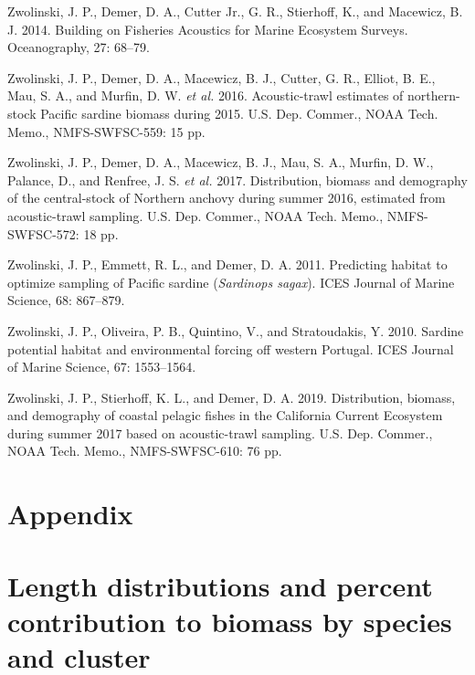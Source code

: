 \documentclass[]{article}
\begin{document}
\leavevmode\hypertarget{ref-Zwolinski2014}{}%
Zwolinski, J. P., Demer, D. A., Cutter Jr., G. R., Stierhoff, K., and Macewicz, B. J. 2014. Building on Fisheries Acoustics for Marine Ecosystem Surveys. Oceanography, 27: 68--79.

\leavevmode\hypertarget{ref-Zwolinski2016}{}%
Zwolinski, J. P., Demer, D. A., Macewicz, B. J., Cutter, G. R., Elliot, B. E., Mau, S. A., and Murfin, D. W. \emph{et al.} 2016. Acoustic-trawl estimates of northern-stock Pacific sardine biomass during 2015. U.S. Dep. Commer., NOAA Tech. Memo., NMFS-SWFSC-559: 15 pp.

\leavevmode\hypertarget{ref-Zwolinski2017}{}%
Zwolinski, J. P., Demer, D. A., Macewicz, B. J., Mau, S. A., Murfin, D. W., Palance, D., and Renfree, J. S. \emph{et al.} 2017. Distribution, biomass and demography of the central-stock of Northern anchovy during summer 2016, estimated from acoustic-trawl sampling. U.S. Dep. Commer., NOAA Tech. Memo., NMFS-SWFSC-572: 18 pp.

\leavevmode\hypertarget{ref-Zwolinski2011}{}%
Zwolinski, J. P., Emmett, R. L., and Demer, D. A. 2011. Predicting habitat to optimize sampling of Pacific sardine (\emph{Sardinops sagax}). ICES Journal of Marine Science, 68: 867--879.

\leavevmode\hypertarget{ref-Zwolinski2010}{}%
Zwolinski, J. P., Oliveira, P. B., Quintino, V., and Stratoudakis, Y. 2010. Sardine potential habitat and environmental forcing off western Portugal. ICES Journal of Marine Science, 67: 1553--1564.

\leavevmode\hypertarget{ref-Zwolinski2019a}{}%
Zwolinski, J. P., Stierhoff, K. L., and Demer, D. A. 2019. Distribution, biomass, and demography of coastal pelagic fishes in the California Current Ecosystem during summer 2017 based on acoustic-trawl sampling. U.S. Dep. Commer., NOAA Tech. Memo., NMFS-SWFSC-610: 76 pp.

\newpage

\hypertarget{appendix-appendix}{%
\appendix}


\hypertarget{appendix}{%
\section*{Appendix}\label{appendix}}

\hypertarget{appendix-cluster-length-percent}{%
\section{Length distributions and percent contribution to biomass by species and cluster}\label{appendix-cluster-length-percent}}
\end{document}
